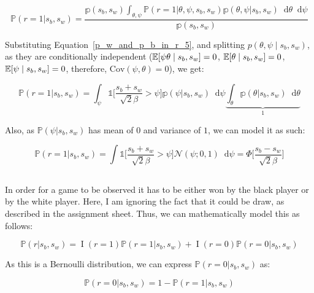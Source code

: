 \documentclass[a4paper,11pt]{article}
\theoremstyle{mytheor}
\newcommand{\E}{\Bbb{E}}
\newcommand{\Cov}{\mathrm{Cov}}
\newcommand*\diff{\mathop{}\!\mathrm{d}}
\begin{document}
\begin{equation}
    \mathbb{P}(r=1|s_b,s_w) = \frac{\mathbb{p}(s_b,s_w)\int_{\theta,\psi} \mathbb{P}(r=1|\theta,\psi,s_b,s_w)\mathbb{p}(\theta,\psi|s_b,s_w)\diff{\theta}\diff{\psi}}{\mathbb{p}(s_b,s_w)}
\end{equation}

Substituting Equation~\ref{p_w_and_p_b_in_r_5}, and splitting $p(\theta,\psi \mid s_b,s_w)$, as they are conditionally independent ($\E[\psi\theta \mid s_b,s_w]=0$, $\E[\theta \mid s_b,s_w]=0$, $\E[\psi \mid s_b,s_w]=0$, therefore, $\Cov(\psi,\theta)=0$), we get:

\begin{equation}
    \mathbb{P}(r=1|s_b,s_w) = \int_{\psi} \mathbb{1}\Big[\frac{s_b+s_w}{\sqrt{2}\beta}>\psi\Big]\mathbb{p}(\psi|s_b,s_w)\diff{\psi}\underbrace{\int_{\theta}\mathbb{p}(\theta|s_b,s_w)\diff{\theta}}_\text{1}
\end{equation}

Also, as $\mathbb{P}(\psi|s_b,s_w)$ has mean of $0$ and variance of $1$, we can model it as such:

\begin{equation}
    \label{eq:r_one_cdf}
    \mathbb{P}(r=1|s_b,s_w) = \int \mathbb{1}\Big[\frac{s_b+s_w}{\sqrt{2}\beta}>\psi\Big]\mathcal{N}( \psi ; 0,1 )\diff{\psi} = \Phi\Big[ \frac{s_b-s_w}{\sqrt{2}\beta} \Big]
\end{equation}

\subsection{}
In order for a game to be observed it has to be either won by the black player or by the white player. Here, I am ignoring the fact that it could be draw, as described in the assignment sheet. Thus, we can mathematically model this as follows:

\begin{equation}
    \label{eq:r_sum}
    \mathbb{P}(r|s_b,s_w) = \mathop{I}(r=1)\mathbb{P}(r=1|s_b,s_w) + \mathop{I}(r=0)\mathbb{P}(r=0|s_b,s_w)
\end{equation}

As this is a Bernoulli distribution, we can express $\mathbb{P}(r=0|s_b,s_w)$ as:

\begin{equation}
    \label{eq:r_zero_expression}
    \mathbb{P}(r=0|s_b,s_w) = 1 - \mathbb{P}(r=1|s_b,s_w)
\end{equation}
\end{document}
